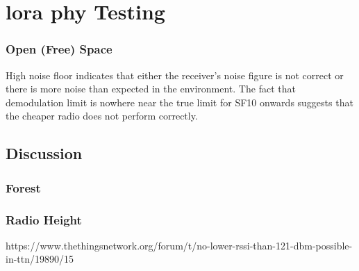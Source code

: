 \chapter{\ac{lora} \ac{phy} Testing}






\subsection{Open (Free) Space}
High noise floor indicates that either the receiver's noise figure is not correct or there is more noise than expected in the environment. The fact that demodulation limit is nowhere near the true limit for SF10 onwards suggests that the cheaper radio does not perform correctly.


\section{Discussion}

\subsection{Forest}
\subsection{Radio Height}

https://www.thethingsnetwork.org/forum/t/no-lower-rssi-than-121-dbm-possible-in-ttn/19890/15